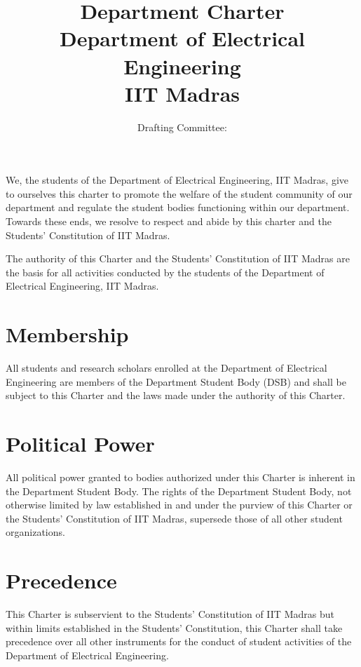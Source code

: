 \documentclass[12pt]{charter}
\makeatletter
\newcommand{\authortable}[1]{
  \gdef\@authortable{%
  \bgroup
	\def\arraystretch{1.5}%
  \begin{tabular}{|c|c|}
  \hline
  \textsc{Rakesh Raavi} & Department Legislator (Academic) 2018-19\\
  \hline
  \textsc{Sudharshan R} & Research Affairs Secretary 2018-19\\
  \hline
  \textsc{Samyak Raj Pasala} & EEA Secretary 2018-19\\
  \hline
  \textsc{B Akhil} & EEA Core 2017-18\\
  \hline
  \end{tabular}
  \egroup
  }
}
\makeatother
\begin{document}
\title{Department Charter\\Department of Electrical Engineering\\IIT Madras}
\author{Drafting Committee:}
\authortable{} %
\date{}
\maketitle
\setcounter{tocdepth}{1}
\tableofcontents
\newpage

We, the students of the Department of Electrical Engineering, IIT Madras, give to ourselves this charter to promote the welfare of the student community of our department and regulate the student bodies functioning within our department. Towards these ends, we resolve to respect and abide by this charter and the Students' Constitution of IIT Madras.



The authority of this Charter and the Students’ Constitution of IIT Madras are the basis for all activities conducted by the students of the Department of Electrical Engineering, IIT Madras.

\section{Membership}
All students and research scholars enrolled at the Department of Electrical Engineering are members of the Department Student Body (DSB) and shall be subject to this Charter and the laws made under the authority of this Charter.


\section{Political Power}
All political power granted to bodies authorized under this Charter is inherent in the Department Student Body. The rights of the Department Student Body, not otherwise limited by law established in and under the purview of this Charter or the Students’ Constitution of IIT Madras, supersede those of all other student organizations.

\section{Precedence}
This Charter is subservient to the Students’ Constitution of IIT Madras but within limits established in the Students’ Constitution, this Charter shall take precedence over all other instruments for the conduct of student activities of the Department of Electrical Engineering.
\end{document}
